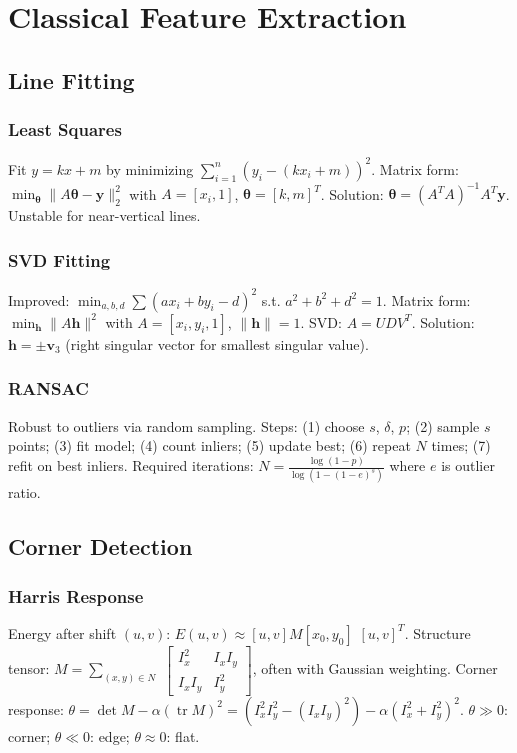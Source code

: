 \section{Classical Feature Extraction}
\subsection{Line Fitting}
\subsubsection*{Least Squares}
Fit $y=kx+m$ by minimizing $\sum_{i=1}^n(y_i-(kx_i+m))^2$.
Matrix form: $\min_{\boldsymbol{\theta}}\|A\boldsymbol{\theta}-\boldsymbol{y}\|_2^2$ with $A=[x_i,1]$, $\boldsymbol{\theta}=[k,m]^T$.
Solution: $\boldsymbol{\theta}=(A^TA)^{-1}A^T\boldsymbol{y}$. Unstable for near-vertical lines.

\subsubsection*{SVD Fitting}
Improved: $\min_{a,b,d}\sum(ax_i+by_i-d)^2$ s.t. $a^2+b^2+d^2=1$.
Matrix form: $\min_{\boldsymbol{h}}\|A\boldsymbol{h}\|^2$ with $A=[x_i,y_i,1]$, $\|\boldsymbol{h}\|=1$.
SVD: $A=UDV^T$. Solution: $\boldsymbol{h}=\pm\boldsymbol{v}_3$ (right singular vector for smallest singular value).

\subsubsection*{RANSAC}
Robust to outliers via random sampling. Steps: (1) choose $s$, $\delta$, $p$; (2) sample $s$ points; (3) fit model; (4) count inliers; (5) update best; (6) repeat $N$ times; (7) refit on best inliers.
Required iterations: $N=\frac{\log(1-p)}{\log(1-(1-e)^s)}$ where $e$ is outlier ratio.

\subsection{Corner Detection}
\subsubsection*{Harris Response}
Energy after shift $(u,v)$: $E(u,v)\approx[u,v]M[x_0,y_0]$
$[u,v]^T$.
Structure tensor: $M=\sum_{(x,y)\in N}$
$\begin{bmatrix}I_x^2&I_xI_y\\I_xI_y&I_y^2\end{bmatrix}$, often with Gaussian weighting.
Corner response: $\theta=\det M-\alpha(\operatorname{tr}M)^2=(I_x^2I_y^2-(I_xI_y)^2)-\alpha(I_x^2+I_y^2)^2$.
$\theta\gg0$: corner; $\theta\ll0$: edge; $\theta\approx0$: flat.

